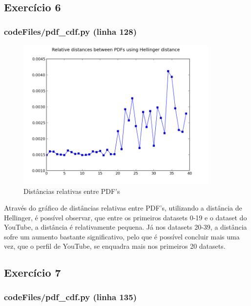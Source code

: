 \documentclass[pdftex,12pt,a4paper]{report}
\begin{document}
\subsection{Exercício 6}
\subsubsection{codeFiles/pdf\_cdf.py (linha 128)}

\begin{figure}[!htb]
\center
 \includegraphics[width=100mm,scale=1]{hellingerDist/Relative_distances_between_PDFs_using_Hellinger_distance_plot.png}
 \caption{Distâncias relativas entre PDF's}
 \label{fig:hellingerDist}
\end{figure}

Através do gráfico de distâncias relativas entre PDF's, utilizando a distância de Hellinger, é possível observar, que entre os primeiros datasets 0-19 e o dataset do YouTube, a distância é relativamente pequena. Já nos datasets 20-39, a distância sofre um aumento bastante significativo, pelo que é possível concluir mais uma vez, que o perfil de YouTube, se enquadra mais nos primeiros 20 datasets.

\subsection{Exercício 7}
\subsubsection{codeFiles/pdf\_cdf.py (linha 135)}
\end{document}
